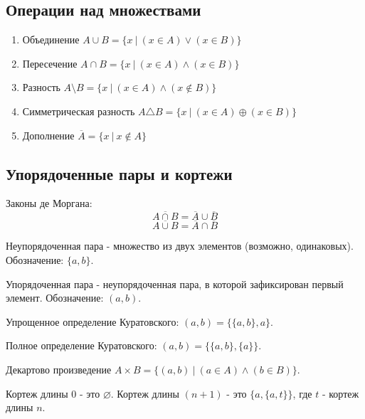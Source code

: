 \subsection{Операции над множествами}
\begin{enumerate}
	\item Объединение $A \cup B = \{x \ | \ (x \in A) \lor (x \in B)\}$
	\item Пересечение $A \cap B = \{x \ | \ (x \in A) \land (x \in B)\}$
	\item Разность $A \setminus B = \{x \ | \ (x \in A) \land (x \notin B)\}$
	\item Симметрическая разность $A \triangle B = \{x \ | \ (x \in A) \oplus (x \in B)\}$
	\item Дополнение $\overline{A} = \{x \ | \ x \notin A\}$
\end{enumerate}

\subsection{Упорядоченные пары и кортежи}
Законы де Моргана:
\[\overline{A \cap B} = \overline{A} \cup \overline{B}\] \[\overline{A \cup B} = \overline{A} \cap \overline{B}\]

\begin{definition}
	Неупорядоченная пара - множество из двух элементов (возможно, одинаковых). Обозначение: $\{a, b\}$.
\end{definition}

\begin{definition}
	Упорядоченная пара - неупорядоченная пара, в которой зафиксирован первый элемент. Обозначение: $(a, b)$.
\end{definition}

\begin{definition}
	Упрощенное определение Куратовского: $(a, b) = \{\{a, b\}, a\}$.
\end{definition}

\begin{definition}
	Полное определение Куратовского: $(a, b) = \{\{a, b\}, \{a\}\}$.
\end{definition}

\begin{definition}
	Декартово произведение $A \times B = \{(a, b) \ | \ (a \in A) \land (b \in B)\}$.
\end{definition}

\begin{definition}
	Кортеж длины 0 - это $\varnothing$. Кортеж длины $(n + 1)$ - это $\{a, \{a, t\}\}$, где $t$ - кортеж длины $n$.
\end{definition}